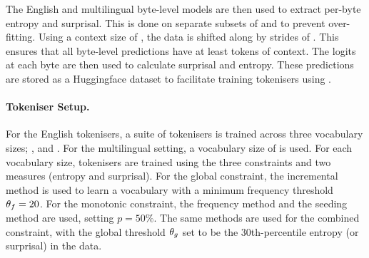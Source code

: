 
The English and multilingual byte-level models are then used to extract per-byte entropy and surprisal. This is done on separate subsets of \fineweb and \commoncorpus to prevent over-fitting. Using a context size of , the data is shifted along by strides of . This ensures that all byte-level predictions have at least  tokens of context. The logits at each byte are then used to calculate surprisal and entropy. These predictions are stored as a Huggingface dataset to facilitate training tokenisers using \tokname.

\paragraph{Tokeniser Setup.} 
For the English tokenisers, a suite of tokenisers is trained across three vocabulary sizes; ,  and . For the multilingual setting, a vocabulary size of  is used. For each vocabulary size, tokenisers are trained using the three constraints and two measures (entropy and surprisal). For the global constraint, the incremental method is used to learn a vocabulary with a minimum frequency threshold $\theta_f = 20$. For the monotonic constraint, the frequency method and the seeding method are used, setting $p=50\%$. The same methods are used for the combined constraint, with the global threshold $\theta_g$ set to be the 30th-percentile entropy (or surprisal) in the data.

